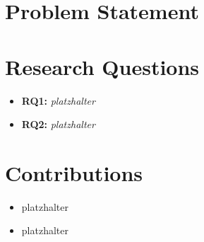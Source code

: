 \section{Problem Statement}


\section{Research Questions}

\begin{itemize}
    \item \textbf{RQ1:} \textit{platzhalter}
    \item \textbf{RQ2:} \textit{platzhalter}
\end{itemize}

\section{Contributions}

\begin{itemize}
    \item platzhalter   
    \item platzhalter   
\end{itemize}